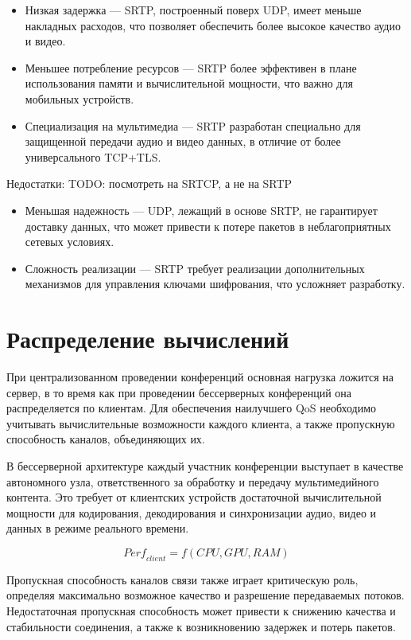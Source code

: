 \begin{itemize}[label=---]
  \item Низкая задержка --- SRTP, построенный поверх UDP, имеет меньше накладных расходов, что позволяет обеспечить более высокое качество аудио и видео.
  \item Меньшее потребление ресурсов --- SRTP более эффективен в плане использования памяти и вычислительной мощности, что важно для мобильных устройств.
  \item Специализация на мультимедиа --- SRTP разработан специально для защищенной передачи аудио и видео данных, в отличие от более универсального TCP+TLS.
\end{itemize}
  
Недостатки: TODO: посмотреть на SRTCP, а не на SRTP

\begin{itemize}[label=---]
  \item Меньшая надежность --- UDP, лежащий в основе SRTP, не гарантирует доставку данных, что может привести к потере пакетов в неблагоприятных сетевых условиях.
  \item Сложность реализации --- SRTP требует реализации дополнительных механизмов для управления ключами шифрования, что усложняет разработку.
\end{itemize}

\section{Распределение вычислений}

При централизованном проведении конференций основная нагрузка ложится на сервер, в то время как при проведении бессерверных конференций она распределяется по клиентам. Для обеспечения наилучшего QoS необходимо учитывать вычислительные возможности каждого клиента, а также пропускную способность каналов, объединяющих их.

В бессерверной архитектуре каждый участник конференции выступает в качестве автономного узла, ответственного за обработку и передачу мультимедийного контента. Это требует от клиентских устройств достаточной вычислительной мощности для кодирования, декодирования и синхронизации аудио, видео и данных в режиме реального времени.

\begin{equation}
  \textit{Perf}_{client} = f(CPU, GPU, RAM)
\end{equation}

Пропускная способность каналов связи также играет критическую роль, определяя максимально возможное качество и разрешение передаваемых потоков. Недостаточная пропускная способность может привести к снижению качества и стабильности соединения, а также к возникновению задержек и потерь пакетов.

